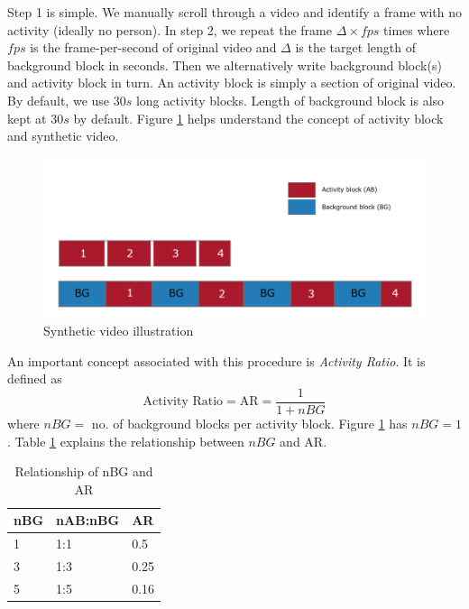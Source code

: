 Step 1 is simple. We manually scroll through a video and identify a frame with no activity (ideally no person). In step 2, we repeat the frame $\Delta \times fps$ times where $fps$ is the frame-per-second of original video and $\Delta$ is the target length of background block in seconds. Then we alternatively write background block(s) and activity block in turn. An activity block is simply a section of original video. By default, we use $30s$ long activity blocks. Length of background block is also kept at $30s$ by default. Figure \ref{fig:synthetic-video} helps understand the concept of activity block and synthetic video.  

\begin{figure}
    \centering
    \includegraphics[width=\linewidth]{images/synthetic-video.PNG}
    \caption{Synthetic video illustration}
    \label{fig:synthetic-video}
\end{figure}

An important concept associated with this procedure is \textit{Activity Ratio}. It is defined as 
$$ \text{Activity Ratio} = \text{AR} = \frac{1}{1+nBG} $$
where $nBG=$ no. of background blocks per activity block. Figure \ref{fig:synthetic-video} has $nBG=1$. Table \ref{table:activity-ratio} explains the relationship between $nBG$ and AR. 


\begin{table}
\label{table:activity-ratio}
\caption{Relationship of nBG and AR} \vspace{5pt}
\centering
\begin{tabular}{@{}| l | l | l | @{}} \hline
nBG & nAB:nBG & AR   \\ \hline \hline
1   & 1:1     & 0.5  \\
3   & 1:3     & 0.25 \\
5   & 1:5     & 0.16 \\ \hline
\end{tabular}
\end{table}

